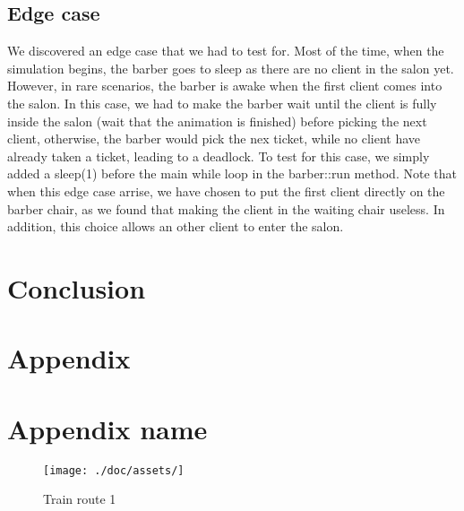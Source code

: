 \documentclass{article}
\begin{document}
    \subsection{Edge case}
    We discovered an edge case that we had to test for. Most of the time, when the simulation begins, the barber goes to sleep as there are no client in the salon yet. However, in rare scenarios, the barber is awake when the first client comes into the salon. In this case, we had to make the barber wait until the client is fully inside the salon (wait that the animation is finished) before picking the next client, otherwise, the barber would pick the nex ticket, while no client have already taken a ticket, leading to a deadlock. To test for this case, we simply added a sleep(1) before the main while loop in the barber::run method.
    Note that when this edge case arrise, we have chosen to put the first client directly on the barber chair, as we found that making the client in the waiting chair useless. In addition, this choice allows an other client to enter the salon.

    \section{Conclusion}

    \section*{Appendix}

    \section{Appendix name}
    \begin{figure}[!htb]
        \centering
        \texttt{[image: ./doc/assets/]}
        \caption{Train route 1}
    \end{figure}
\end{document}

